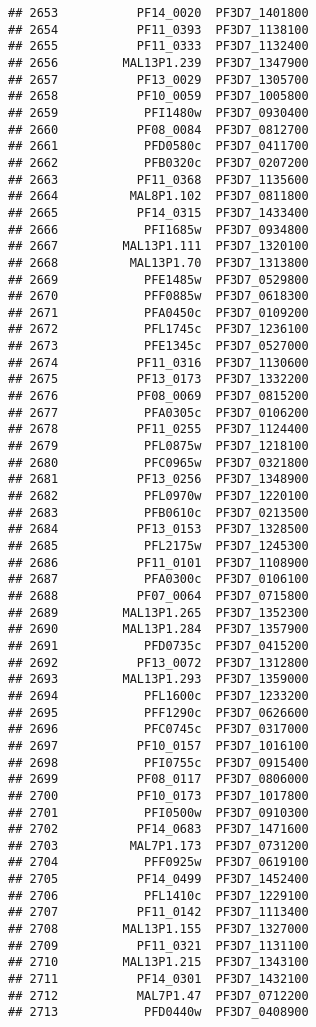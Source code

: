 \documentclass[12pt, a4paper]{article}\usepackage[]{graphicx}\usepackage[]{color}
\makeatletter
\newenvironment{kframe}{%
 \def\at@end@of@kframe{}%
 \ifinner\ifhmode%
  \def\at@end@of@kframe{\end{minipage}}%
  \begin{minipage}{\columnwidth}%
 \fi\fi%
 \def\FrameCommand##1{\hskip\@totalleftmargin \hskip-\fboxsep
 \colorbox{shadecolor}{##1}\hskip-\fboxsep
     \hskip-\linewidth \hskip-\@totalleftmargin \hskip\columnwidth}%
 \MakeFramed {\advance\hsize-\width
   \@totalleftmargin\z@ \linewidth\hsize
   \@setminipage}}%
 {\par\unskip\endMakeFramed%
 \at@end@of@kframe}
\newenvironment{knitrout}{}{} %
\makeatother
\begin{document}
\begin{knitrout}
\begin{kframe}
\begin{verbatim}
## 2653           PF14_0020  PF3D7_1401800
## 2654           PF11_0393  PF3D7_1138100
## 2655           PF11_0333  PF3D7_1132400
## 2656         MAL13P1.239  PF3D7_1347900
## 2657           PF13_0029  PF3D7_1305700
## 2658           PF10_0059  PF3D7_1005800
## 2659            PFI1480w  PF3D7_0930400
## 2660           PF08_0084  PF3D7_0812700
## 2661            PFD0580c  PF3D7_0411700
## 2662            PFB0320c  PF3D7_0207200
## 2663           PF11_0368  PF3D7_1135600
## 2664          MAL8P1.102  PF3D7_0811800
## 2665           PF14_0315  PF3D7_1433400
## 2666            PFI1685w  PF3D7_0934800
## 2667         MAL13P1.111  PF3D7_1320100
## 2668          MAL13P1.70  PF3D7_1313800
## 2669            PFE1485w  PF3D7_0529800
## 2670            PFF0885w  PF3D7_0618300
## 2671            PFA0450c  PF3D7_0109200
## 2672            PFL1745c  PF3D7_1236100
## 2673            PFE1345c  PF3D7_0527000
## 2674           PF11_0316  PF3D7_1130600
## 2675           PF13_0173  PF3D7_1332200
## 2676           PF08_0069  PF3D7_0815200
## 2677            PFA0305c  PF3D7_0106200
## 2678           PF11_0255  PF3D7_1124400
## 2679            PFL0875w  PF3D7_1218100
## 2680            PFC0965w  PF3D7_0321800
## 2681           PF13_0256  PF3D7_1348900
## 2682            PFL0970w  PF3D7_1220100
## 2683            PFB0610c  PF3D7_0213500
## 2684           PF13_0153  PF3D7_1328500
## 2685            PFL2175w  PF3D7_1245300
## 2686           PF11_0101  PF3D7_1108900
## 2687            PFA0300c  PF3D7_0106100
## 2688           PF07_0064  PF3D7_0715800
## 2689         MAL13P1.265  PF3D7_1352300
## 2690         MAL13P1.284  PF3D7_1357900
## 2691            PFD0735c  PF3D7_0415200
## 2692           PF13_0072  PF3D7_1312800
## 2693         MAL13P1.293  PF3D7_1359000
## 2694            PFL1600c  PF3D7_1233200
## 2695            PFF1290c  PF3D7_0626600
## 2696            PFC0745c  PF3D7_0317000
## 2697           PF10_0157  PF3D7_1016100
## 2698            PFI0755c  PF3D7_0915400
## 2699           PF08_0117  PF3D7_0806000
## 2700           PF10_0173  PF3D7_1017800
## 2701            PFI0500w  PF3D7_0910300
## 2702           PF14_0683  PF3D7_1471600
## 2703          MAL7P1.173  PF3D7_0731200
## 2704            PFF0925w  PF3D7_0619100
## 2705           PF14_0499  PF3D7_1452400
## 2706            PFL1410c  PF3D7_1229100
## 2707           PF11_0142  PF3D7_1113400
## 2708         MAL13P1.155  PF3D7_1327000
## 2709           PF11_0321  PF3D7_1131100
## 2710         MAL13P1.215  PF3D7_1343100
## 2711           PF14_0301  PF3D7_1432100
## 2712           MAL7P1.47  PF3D7_0712200
## 2713            PFD0440w  PF3D7_0408900

\end{verbatim}
\end{kframe}
\end{knitrout}
\end{document}
